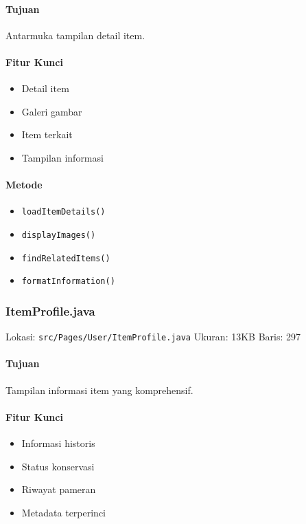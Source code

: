 \documentclass[12pt,a4paper]{article}
\begin{document}
\paragraph{Tujuan}
Antarmuka tampilan detail item.

\paragraph{Fitur Kunci}
\begin{itemize}
    \item Detail item
    \item Galeri gambar
    \item Item terkait
    \item Tampilan informasi
\end{itemize}

\paragraph{Metode}
\begin{itemize}
    \item \texttt{loadItemDetails()}
    \item \texttt{displayImages()}
    \item \texttt{findRelatedItems()}
    \item \texttt{formatInformation()}
\end{itemize}

\subsubsection{ItemProfile.java}
Lokasi: \texttt{src/Pages/User/ItemProfile.java}
Ukuran: 13KB
Baris: 297

\paragraph{Tujuan}
Tampilan informasi item yang komprehensif.

\paragraph{Fitur Kunci}
\begin{itemize}
    \item Informasi historis
    \item Status konservasi
    \item Riwayat pameran
    \item Metadata terperinci
\end{itemize}
\end{document}
